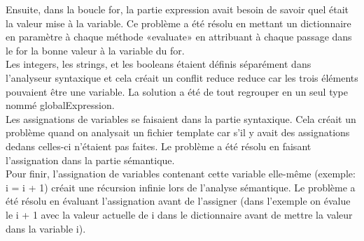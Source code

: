 ﻿\documentclass{report}
\begin{document}
Ensuite, dans la boucle for, la partie expression avait besoin de savoir quel était la valeur mise à la variable. Ce problème a été résolu en mettant un dictionnaire en paramètre à chaque méthode «evaluate» en attribuant à chaque passage dans le for la bonne valeur à la variable du for.\\

Les integers, les strings, et les booleans étaient définis séparément dans l'analyseur syntaxique et cela créait un conflit reduce reduce car les trois éléments pouvaient être une variable. La solution a été de tout regrouper en un seul type nommé globalExpression.\\

Les assignations de variables se faisaient dans la partie syntaxique. Cela créait un problème quand on analysait un fichier template car s'il y avait des assignations dedans celles-ci n'étaient pas faites. Le problème a été résolu en faisant l'assignation dans la partie sémantique.\\

Pour finir, l'assignation de variables contenant cette variable elle-même (exemple: i = i + 1) créait une récursion infinie lors de l'analyse sémantique. Le problème a été résolu en évaluant l'assignation avant de l'assigner (dans l'exemple on évalue le i + 1 avec la valeur actuelle de i dans le dictionnaire avant de mettre la valeur dans la variable i).
\end{document}
